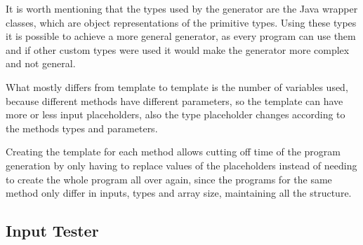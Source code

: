 It is worth mentioning that the types used by the generator are the Java wrapper classes, which are object representations of the primitive types. Using these types it is possible to achieve a more general generator, as every program can use them and if other custom types were used it would make the generator more complex and not general.

What mostly differs from template to template is the number of variables used, because different methods have different parameters, so the template can have more or less input placeholders, also the type placeholder changes according to the methods types and parameters.


Creating the template for each method allows cutting off time of the program generation by only having to replace values of the placeholders instead of needing to create the whole program all over again, since the programs for the same method only differ in inputs, types and array size, maintaining all the structure.

\subsection{Input Tester} \label{sec:work_stage1_input_tester}

